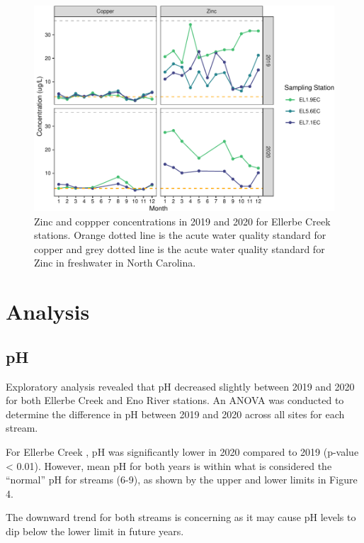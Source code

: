 \documentclass[
  12pt,
]{article}
\begin{document}
\begin{figure}
\centering
\includegraphics{August_Lindborg_ENV872_Project_files/figure-latex/unnamed-chunk-12-1.pdf}
\caption{Zinc and coppper concentrations in 2019 and 2020 for Ellerbe
Creek stations. Orange dotted line is the acute water quality standard
for copper and grey dotted line is the acute water quality standard for
Zinc in freshwater in North Carolina.}
\end{figure}

\newpage

\hypertarget{analysis}{%
\section{Analysis}\label{analysis}}

\hypertarget{ph}{%
\subsection{pH}\label{ph}}

Exploratory analysis revealed that pH decreased slightly between 2019
and 2020 for both Ellerbe Creek and Eno River stations. An ANOVA was
conducted to determine the difference in pH between 2019 and 2020 across
all sites for each stream.

For Ellerbe Creek , pH was significantly lower in 2020 compared to 2019
(p-value \textless{} 0.01). However, mean pH for both years is within
what is considered the ``normal'' pH for streams (6-9), as shown by the
upper and lower limits in Figure 4.

The downward trend for both streams is concerning as it may cause pH
levels to dip below the lower limit in future years.
\end{document}

